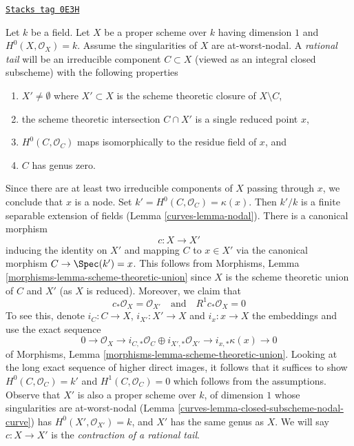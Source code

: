 \begin{example}

\label{curves-example-rational-tail}
\href{https://stacks.math.columbia.edu/tag/0E3H}{\texttt{Stacks tag 0E3H}}

Let $k$ be a field. Let $X$ be a proper scheme over $k$ having dimension $1$
and $H^0(X, \mathcal{O}_X) = k$. Assume the singularities of $X$ are
at-worst-nodal.
A {\it rational tail} will be an irreducible component $C \subset X$
(viewed as an integral closed subscheme) with the following properties
\begin{enumerate}
\item $X' \not = \emptyset$ where $X' \subset X$ is the scheme theoretic closure
of $X \setminus C$,
\item the scheme theoretic intersection $C \cap X'$ is a single
reduced point $x$,
\item $H^0(C, \mathcal{O}_C)$ maps isomorphically to the
residue field of $x$, and
\item $C$ has genus zero.
\end{enumerate}
Since there are at least two irreducible components of $X$ passing through
$x$, we conclude that $x$ is a node.
Set $k' = H^0(C, \mathcal{O}_C) = \kappa(x)$.
Then $k'/k$ is a finite separable extension of fields
(Lemma \ref{curves-lemma-nodal}). There is a canonical morphism
$$
c : X \longrightarrow X'
$$
inducing the identity on $X'$ and mapping $C$ to $x \in X'$
via the canonical morphism $C \to \Spec(k') = x$. This follows from
Morphisms, Lemma \ref{morphisms-lemma-scheme-theoretic-union}
since $X$ is the scheme theoretic union of $C$ and $X'$ (as $X$ is reduced).
Moreover, we claim that
$$
c_*\mathcal{O}_X = \mathcal{O}_{X'}
\quad\text{and}\quad
R^1c_*\mathcal{O}_X = 0
$$
To see this, denote $i_C : C \to X$, $i_{X'} : X' \to X$ and $i_x : x \to X$
the embeddings and use the exact sequence
$$
0 \to \mathcal{O}_X \to
i_{C, *}\mathcal{O}_C \oplus i_{X', *}\mathcal{O}_{X'} \to
i_{x, *}\kappa(x) \to 0
$$
of Morphisms, Lemma \ref{morphisms-lemma-scheme-theoretic-union}.
Looking at the long exact sequence of higher direct images,
it follows that it suffices to show $H^0(C, \mathcal{O}_C) = k'$
and $H^1(C, \mathcal{O}_C) = 0$ which follows from the assumptions.
Observe that $X'$ is also a proper scheme over $k$, of dimension $1$
whose singularities are at-worst-nodal
(Lemma \ref{curves-lemma-closed-subscheme-nodal-curve})
has $H^0(X', \mathcal{O}_{X'}) = k$, and
$X'$ has the same genus as $X$.
We will say $c : X \to X'$ is the
{\it contraction of a rational tail}.
\end{example}

